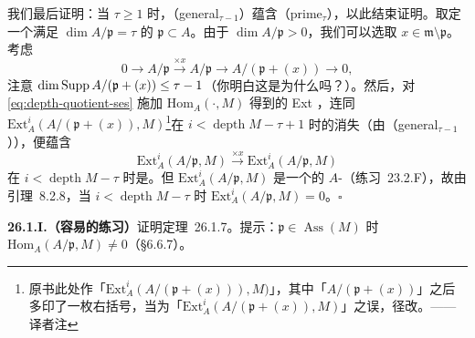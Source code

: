 我们最后证明：当 $\tau\ge 1$ 时，（general$_{\tau-1}$）蕴含（prime$_\tau$），以此结束证明。取定一个满足 $\dim A/\mathfrak{p}=\tau$ 的\trPrimeIdeal{} $\mathfrak{p}\subset A$。由于 $\dim A/\mathfrak{p}>0$，我们可以选取 $x\in\mathfrak{m}\setminus\mathfrak{p}$。考虑\trExactSequence{}
\[
\tag{26.1.8.1}\label{eq:depth-quotient-ses}
0 \longrightarrow A/\mathfrak{p} \overset{\times x}{\longrightarrow} A/\mathfrak{p} \longrightarrow A/(\mathfrak{p}+(x)) \longrightarrow 0,
\]
注意 $\dim\operatorname{Supp} A/(\mathfrak{p}+(x))\le\tau-1$（你明白这是为什么吗？）。然后，对 \eqref{eq:depth-quotient-ses} 施加 $\mathrm{Hom}_A(\cdot,M)$ 得到的 Ext \trLongExactSequence，连同 $\mathrm{Ext}^i_A(A/(\mathfrak{p}+(x)),M)$\footnote{原书此处作「$\mathrm{Ext}^i_A(A/(\mathfrak{p}+(x))),M)$」，其中「$A/(\mathfrak{p}+(x))$」之后多印了一枚右括号，当为「$\mathrm{Ext}^i_A(A/(\mathfrak{p}+(x)),M)$」之误，径改。——译者注}在 $i<\operatorname{depth}M-\tau+1$ 时的消失（由（general$_{\tau-1}$）），便蕴含
\[
\mathrm{Ext}^i_A(A/\mathfrak{p},M) \overset{\times x}{\longrightarrow} \mathrm{Ext}^i_A(A/\mathfrak{p},M)
\]
在 $i<\operatorname{depth}M-\tau$ 时是\trIsomorphism。但 $\mathrm{Ext}^i_A(A/\mathfrak{p},M)$ 是一个\trFinitelyGenerated{}的 $A$-\trModule（\mbox{练习~23.2.F}），故由\mbox{\trNakayama{}引理~8.2.8}，当 $i<\operatorname{depth}M-\tau$ 时 $\mathrm{Ext}^i_A(A/\mathfrak{p},M)=0$。\hfill$\square$

\textbf{26.1.I.（容易的练习）}\quad 证明\mbox{定理~26.1.7}。提示：$\mathfrak{p}\in\operatorname{Ass}(M)$ 时 $\mathrm{Hom}_A(A/\mathfrak{p},M)\ne 0$（\S6.6.7）。

